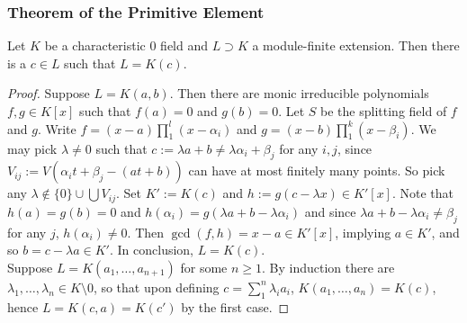 \subsubsection{Theorem of the Primitive Element}
    \begin{theorem}
        Let $K$ be a characteristic $0$ field and $L\supset K$ a module-finite extension. Then there is a $c\in L$ such that $L=K(c)$.
    \end{theorem}
    \begin{proof}
        Suppose $L=K(a,b)$. Then there are monic irreducible polynomials $f,g\in K[x]$ such that $f(a)=0$ and $g(b)=0$. Let $S$ be the splitting field of $f$ and $g$. Write $f=(x-a)\prod_1^l (x-\alpha_i)$ and $g=(x-b)\prod_1^k(x-\beta_i)$. We may pick $\lambda \neq 0$ such that $c:=\lambda a+b\neq \lambda \alpha_i+ \beta_j$ for any $i,j$, since $V_{ij}:=V(\alpha_it+\beta_j-(at+b))$ can have at most finitely many points. So pick any $\lambda\notin \{0\}\cup\bigcup V_{ij}$. Set $K':= K(c)$ and $h:=g(c-\lambda x)\in K'[x]$. Note that $h(a)=g(b)=0$ and $h(\alpha_i)=g(\lambda a + b-\lambda\alpha_i)$ and since $\lambda a + b-\lambda\alpha_i\neq \beta_j$ for any $j$, $h(\alpha_i)\neq 0$. Then $\gcd(f,h)=x-a\in K'[x]$, implying $a\in K'$, and so $b=c-\lambda a\in K'$. In conclusion, $L=K(c)$.\\
        Suppose $L=K(a_1,\dots,a_{n+1})$ for some $n\geq 1$. By induction there are $\lambda_1,\dots,\lambda_n\in K\setminus 0$, so that upon defining $c=\sum_1^n \lambda_ia_i$,  $K(a_1,\dots,a_n)=K(c)$, hence $L=K(c,a)=K(c')$ by the first case.
    \end{proof}
